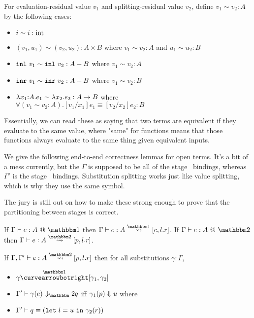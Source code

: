 \begin{definition}
For evaluation-residual value $v_1$ and splitting-residual value $v_2$, define $v_1 \sim v_2 : A$ by the following cases:
\begin{itemize}
\item $i \sim i : {\rm int}$
\item $(v_1,u_1) \sim (v_2,u_2) : A \times B$ where $v_1 \sim v_2 : A$ and $u_1 \sim u_2 : B$
\item ${\tt inl}~v_1 \sim {\tt inl}~v_2 : A + B$ where $v_1 \sim v_2 : A$
\item ${\tt inr}~v_1 \sim {\tt inr}~v_2 : A + B$ where $v_1 \sim v_2 : B$
\item $\lambda{x_1}\mathrm{:}{A}.{e_1} \sim \lambda x_2.e_2 : A \to B$ where \\ $\forall (v_1 \sim v_2 : A). [v_1/x_1]e_1 \equiv [v_2/x_2]e_2 : B$
\end{itemize}
\end{definition}

Essentially, we can read these as saying that two terms are equivalent if they evaluate to the same value,
where "same" for functions means that those functions always evaluate to the same thing given equivalent inputs.

We give the following end-to-end correctness lemmas for open terms. 
It's a bit of a mess currently, but the $\Gamma$ is supposed to be all of the stage \bbone\ bindings, 
whereas $\Gamma'$ is the stage \bbtwo\ bindings.
Substitution splitting works just like value splitting, which is why they use the same symbol.

The jury is still out on how to make these strong enough to prove that the partitioning between stages is correct.

\begin{lemma}
If $\typesone e A$ then
$\Gamma\vdash e : A \splitonesym [c,l.r]$.
If $\typestwo e A$ then
$\Gamma\vdash e : A \splittwosym [p,l.r]$.
\end{lemma}

\begin{lemma}
If $\Gamma, \Gamma'\vdash e : A \splittwosym [p,l.r]$ then for all substitutions $\gamma : \Gamma$,
\begin{itemize}
\item $\gamma \vsplito [\gamma_1, \gamma_2]$
\item $\diatwo [\Gamma'] {\gamma(e)} q$ iff ${\gamma_1(p)} \Downarrow {u}$ where
\item $\Gamma' \vdash q \equiv ({\tt let}~{l} = {u}~{\tt in}~{\gamma_2(r)})$
\end{itemize}
\end{lemma}

